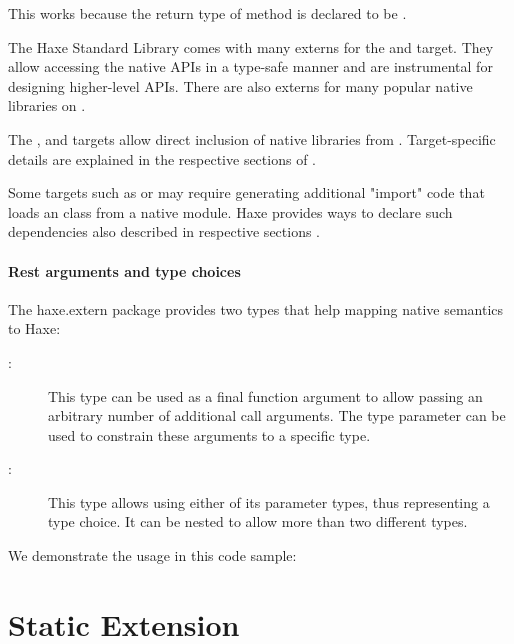 
This works because the return type of method  is declared to be .

The Haxe Standard Library comes with many externs for the  and  target. They allow accessing the native APIs in a type-safe manner and are instrumental for designing higher-level APIs. There are also externs for many popular native libraries on .

The ,  and  targets allow direct inclusion of native libraries from . Target-specific details are explained in the respective sections of .

Some targets such as  or  may require generating additional "import" code that loads an  class from a native module. Haxe provides ways to declare such dependencies also described in respective sections .

\paragraph{Rest arguments and type choices}

The haxe.extern package provides two types that help mapping native semantics to Haxe:

\begin{description}
	\item[:] This type can be used as a final function argument to allow passing an arbitrary number of additional call arguments. The type parameter can be used to constrain these arguments to a specific type.
	\item[:] This type allows using either of its parameter types, thus representing a type choice. It can be nested to allow more than two different types.
\end{description}

We demonstrate the usage in this code sample:



\section{Static Extension}
\label{lf-static-extension}


